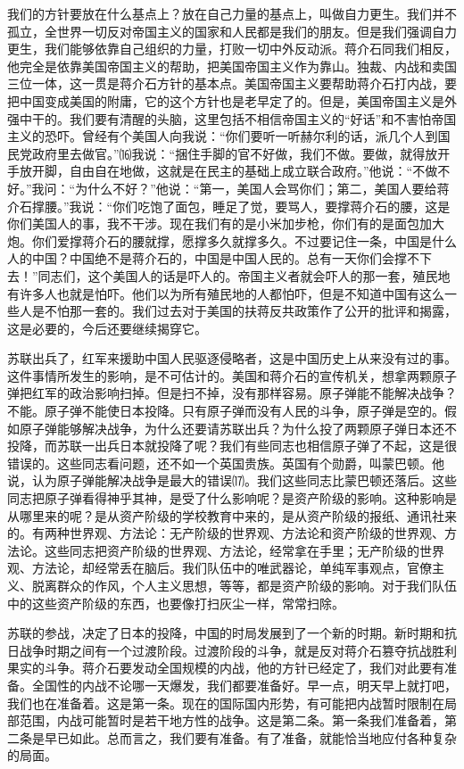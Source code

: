 \documentclass[UTF-8, a5paper, 12pt]{ctexart}
\begin{document}
    我们的方针要放在什么基点上？放在自己力量的基点上，叫做自力更生。我们并不孤立，全世界一切反对帝国主义的国家和人民都是我们的朋友。但是我们强调自力更生，我们能够依靠自己组织的力量，打败一切中外反动派。蒋介石同我们相反，他完全是依靠美国帝国主义的帮助，把美国帝国主义作为靠山。独裁、内战和卖国三位一体，这一贯是蒋介石方针的基本点。美国帝国主义要帮助蒋介石打内战，要把中国变成美国的附庸，它的这个方针也是老早定了的。但是，美国帝国主义是外强中干的。我们要有清醒的头脑，这里包括不相信帝国主义的“好话”和不害怕帝国主义的恐吓。曾经有个美国人向我说：“你们要听一听赫尔利的话，派几个人到国民党政府里去做官。”⒃我说：“捆住手脚的官不好做，我们不做。要做，就得放开手放开脚，自由自在地做，这就是在民主的基础上成立联合政府。”他说：“不做不好。”我问：“为什么不好？”他说：“第一，美国人会骂你们；第二，美国人要给蒋介石撑腰。”我说：“你们吃饱了面包，睡足了觉，要骂人，要撑蒋介石的腰，这是你们美国人的事，我不干涉。现在我们有的是小米加步枪，你们有的是面包加大炮。你们爱撑蒋介石的腰就撑，愿撑多久就撑多久。不过要记住一条，中国是什么人的中国？中国绝不是蒋介石的，中国是中国人民的。总有一天你们会撑不下去！”同志们，这个美国人的话是吓人的。帝国主义者就会吓人的那一套，殖民地有许多人也就是怕吓。他们以为所有殖民地的人都怕吓，但是不知道中国有这么一些人是不怕那一套的。我们过去对于美国的扶蒋反共政策作了公开的批评和揭露，这是必要的，今后还要继续揭穿它。
    
    苏联出兵了，红军来援助中国人民驱逐侵略者，这是中国历史上从来没有过的事。这件事情所发生的影响，是不可估计的。美国和蒋介石的宣传机关，想拿两颗原子弹把红军的政治影响扫掉。但是扫不掉，没有那样容易。原子弹能不能解决战争？不能。原子弹不能使日本投降。只有原子弹而没有人民的斗争，原子弹是空的。假如原子弹能够解决战争，为什么还要请苏联出兵？为什么投了两颗原子弹日本还不投降，而苏联一出兵日本就投降了呢？我们有些同志也相信原子弹了不起，这是很错误的。这些同志看问题，还不如一个英国贵族。英国有个勋爵，叫蒙巴顿。他说，认为原子弹能解决战争是最大的错误⒄。我们这些同志比蒙巴顿还落后。这些同志把原子弹看得神乎其神，是受了什么影响呢？是资产阶级的影响。这种影响是从哪里来的呢？是从资产阶级的学校教育中来的，是从资产阶级的报纸、通讯社来的。有两种世界观、方法论：无产阶级的世界观、方法论和资产阶级的世界观、方法论。这些同志把资产阶级的世界观、方法论，经常拿在手里；无产阶级的世界观、方法论，却经常丢在脑后。我们队伍中的唯武器论，单纯军事观点，官僚主义、脱离群众的作风，个人主义思想，等等，都是资产阶级的影响。对于我们队伍中的这些资产阶级的东西，也要像打扫灰尘一样，常常扫除。
    
    苏联的参战，决定了日本的投降，中国的时局发展到了一个新的时期。新时期和抗日战争时期之间有一个过渡阶段。过渡阶段的斗争，就是反对蒋介石篡夺抗战胜利果实的斗争。蒋介石要发动全国规模的内战，他的方针已经定了，我们对此要有准备。全国性的内战不论哪一天爆发，我们都要准备好。早一点，明天早上就打吧，我们也在准备着。这是第一条。现在的国际国内形势，有可能把内战暂时限制在局部范围，内战可能暂时是若干地方性的战争。这是第二条。第一条我们准备着，第二条是早已如此。总而言之，我们要有准备。有了准备，就能恰当地应付各种复杂的局面。
\end{document}
